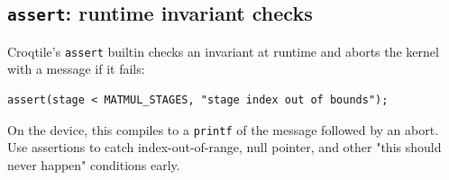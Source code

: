 \subsection*{\texttt{assert}: runtime invariant checks}

Croqtile's \texttt{assert} builtin checks an invariant at runtime and aborts the kernel with a message if it fails:

\begin{lstlisting}[language=croqtile,caption={assert: runtime invariant checks}]
assert(stage < MATMUL_STAGES, "stage index out of bounds");
\end{lstlisting}

On the device, this compiles to a \texttt{printf} of the message followed by an abort. Use assertions to catch index-out-of-range, null pointer, and other "this should never happen" conditions early.
